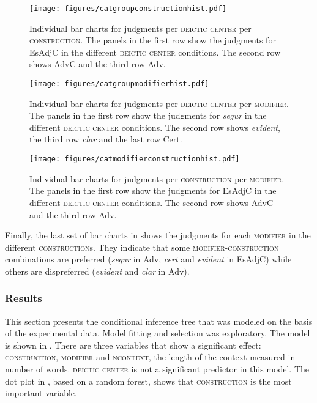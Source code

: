 \begin{figure}
		\texttt{[image: figures/catgroupconstructionhist.pdf]}
		\caption{Individual bar charts for judgments per \textsc{deictic center} per \textsc{construction}. The panels in the first row show the judgments for EsAdjC in the different \textsc{deictic center} conditions. The second row shows AdvC and the third row Adv.\label{fig:catgroupconst}}
\end{figure}
 
\begin{figure}
	\caption{Individual bar charts for judgments per \textsc{deictic center} per \textsc{modifier}. The panels in the first row show the judgments for \textit{segur} in the different \textsc{deictic center} conditions. The second row shows \textit{evident}, the third row \textit{clar} and the last row Cert.\label{fig:catgroupmod}}
	\texttt{[image: figures/catgroupmodifierhist.pdf]}
\end{figure}
\begin{figure}
	\caption{Individual bar charts for judgments per \textsc{construction} per \textsc{modifier}. The panels in the first row show the judgments for EsAdjC in the different \textsc{deictic center} conditions. The second row shows AdvC and the third row Adv.\label{tab:catconstmod}}
	\texttt{[image: figures/catmodifierconstructionhist.pdf]}
\end{figure}




Finally, the last set of bar charts in  shows the judgments for each \textsc{modifier} in the different \textsc{construction}s. They indicate that some \textsc{modifier}-\textsc{con\-struc\-tion} combinations are preferred  (\textit{segur} in Adv, \textit{cert} and \textit{evident} in EsAdjC) while others are dispreferred  (\textit{evident} and \textit{clar} in Adv).





\subsubsection{Results}\label{sec:rescatempev}\largerpage
This section presents the conditional inference tree that was modeled on the basis of the experimental data. Model fitting and selection was  exploratory. The model is shown in 
. There are three variables that show a significant effect: \textsc{construction}, \textsc{modifier} and \textsc{ncontext}, the length of the context measured in number of words. \textsc{deictic center} is not a significant predictor in this model. The dot plot in , based on a random forest, shows that \textsc{construction} is  the most important variable. 

